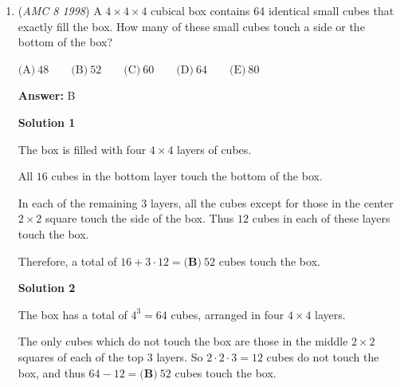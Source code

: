 \begin{enumerate}
$\text{(A)}\ 9 \qquad \text{(B)}\ 16 \qquad \text{(C)}\ 18 \qquad \text{(D)}\ 24 \qquad \text{(E)}\ 36$

 \textbf{Answer: }D



\textbf{Solution}

After both folds are completed, the square would become a triangle that has an area of $\frac{1}{2} \cdot \frac{1}{2} = \frac{1}{4}$ of the original square.

 Since the area is $9$ square inches for $\frac{1}{4}$ of the square, $9\times4=36$ square inches is the area of square $PQRS$

 The length of the side of a square that has an area of $36$ square inches is $\sqrt{36}=6$ inches.

 Each side is $6$ inches, so the total perimeter is $6\times4=24=\boxed{D}$



	\item (\textit{AMC 8 1998}) A $4\times 4\times 4$ cubical box contains 64 identical small cubes that exactly fill the box.  How many of these small cubes touch a side or the bottom of the box?


 $\text{(A)}\ 48 \qquad \text{(B)}\ 52 \qquad \text{(C)}\ 60 \qquad \text{(D)}\ 64 \qquad \text{(E)}\ 80$

 \textbf{Answer: }B



\textbf{Solution 1}

The box is filled with four $4 \times 4$ layers of cubes.

 All $16$ cubes in the bottom layer touch the bottom of the box.

 In each of the remaining $3$ layers, all the cubes except for those in the center $2 \times 2$ square touch the side of the box.  Thus $12$ cubes in each of these layers touch the box.

 Therefore, a total of $16 + 3 \cdot 12 = \boxed{\textbf{(B)}\ 52}$ cubes touch the box.

 



\textbf{Solution 2}

The box has a total of $4^3 = 64$ cubes, arranged in four $4 \times 4$ layers.

 The only cubes which do not touch the box are those in the middle $2 \times 2$ squares of each of the top $3$ layers.  So $2 \cdot 2 \cdot 3 = 12$ cubes do not touch the box, and thus $64 - 12 = \boxed{\textbf{(B)}\ 52}$ cubes touch the box.


\end{enumerate}
